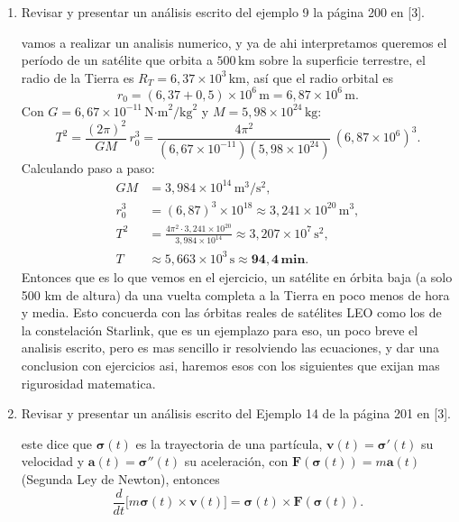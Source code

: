 \begin{enumerate}
    \item Revisar y presentar un análisis escrito del ejemplo 9 la página 200 en [3].

    \begin{respuesta}[title=P15.7 ]
    vamos a realizar un analisis numerico, y ya de ahi interpretamos queremos el período de un satélite que
orbita a $500\,\text{km}$ sobre la superficie terrestre, el radio de la Tierra
es $R_T = 6{,}37\times10^3\,\text{km}$, así que el radio orbital es
\[
  r_0 = (6{,}37 + 0{,}5)\times10^6\,\text{m}
      = 6{,}87\times10^6\,\text{m}.
\]
Con $G = 6{,}67\times10^{-11}\,\text{N·m}^2/\text{kg}^2$ y
$M = 5{,}98\times10^{24}\,\text{kg}$:
\[
  T^2 = \frac{(2\pi)^2}{GM}\,r_0^3
      = \frac{4\pi^2}{(6{,}67\times10^{-11})(5{,}98\times10^{24})}
        \,(6{,}87\times10^6)^3.
\]
Calculando paso a paso:
\begin{align*}
  GM &= 3{,}984\times10^{14}\,\text{m}^3/\text{s}^2,\\
  r_0^3 &= (6{,}87)^3\times10^{18} \approx 3{,}241\times10^{20}\,\text{m}^3,\\
  T^2 &= \frac{4\pi^2 \cdot 3{,}241\times10^{20}}{3{,}984\times10^{14}}
        \approx 3{,}207\times10^7\,\text{s}^2,\\
  T &\approx 5{,}663\times10^3\,\text{s} \approx \mathbf{94{,}4\,\text{min}}.
\end{align*}
Entonces que es lo que vemos en el ejercicio, un satélite en órbita baja (a solo 500 km de altura)
da una vuelta completa a la Tierra en poco menos de hora y media.
Esto concuerda con las órbitas reales de satélites LEO como los de la
constelación Starlink, que es un ejemplazo para eso, un poco breve el analisis escrito, pero es mas sencillo ir resolviendo las ecuaciones, y dar una conclusion con ejercicios asi, haremos esos con los siguientes que exijan mas rigurosidad matematica.
        \vspace{5cm}
    \end{respuesta}

    \item Revisar y presentar un análisis escrito del Ejemplo 14 de la página 201 en [3].

    \begin{respuesta}[title=P15.8 ]

este dice que $\boldsymbol{\sigma}(t)$ es la trayectoria de una
partícula, $\mathbf{v}(t)=\boldsymbol{\sigma}'(t)$ su velocidad y
$\mathbf{a}(t)=\boldsymbol{\sigma}''(t)$ su aceleración, con
$\mathbf{F}(\boldsymbol{\sigma}(t))=m\mathbf{a}(t)$ (Segunda Ley de Newton),
entonces
\[
  \frac{d}{dt}\bigl[m\boldsymbol{\sigma}(t)\times\mathbf{v}(t)\bigr]
  = \boldsymbol{\sigma}(t)\times\mathbf{F}(\boldsymbol{\sigma}(t)).
\]


\end{respuesta}
\end{enumerate}
